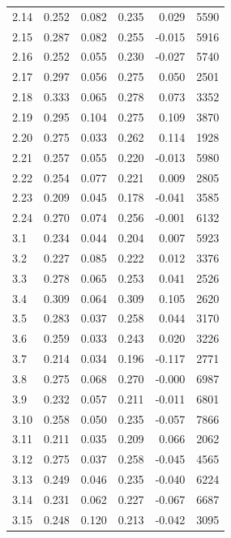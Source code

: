 \begin{longtable}{lrrrrr}
2.14 & 0.252 & 0.082 & 0.235 & 0.029 & 5590 \\
2.15 & 0.287 & 0.082 & 0.255 & -0.015 & 5916 \\
2.16 & 0.252 & 0.055 & 0.230 & -0.027 & 5740 \\
2.17 & 0.297 & 0.056 & 0.275 & 0.050 & 2501 \\
2.18 & 0.333 & 0.065 & 0.278 & 0.073 & 3352 \\
2.19 & 0.295 & 0.104 & 0.275 & 0.109 & 3870 \\
2.20 & 0.275 & 0.033 & 0.262 & 0.114 & 1928 \\
2.21 & 0.257 & 0.055 & 0.220 & -0.013 & 5980 \\
2.22 & 0.254 & 0.077 & 0.221 & 0.009 & 2805 \\
2.23 & 0.209 & 0.045 & 0.178 & -0.041 & 3585 \\
2.24 & 0.270 & 0.074 & 0.256 & -0.001 & 6132 \\
3.1 & 0.234 & 0.044 & 0.204 & 0.007 & 5923 \\
3.2 & 0.227 & 0.085 & 0.222 & 0.012 & 3376 \\
3.3 & 0.278 & 0.065 & 0.253 & 0.041 & 2526 \\
3.4 & 0.309 & 0.064 & 0.309 & 0.105 & 2620 \\
3.5 & 0.283 & 0.037 & 0.258 & 0.044 & 3170 \\
3.6 & 0.259 & 0.033 & 0.243 & 0.020 & 3226 \\
3.7 & 0.214 & 0.034 & 0.196 & -0.117 & 2771 \\
3.8 & 0.275 & 0.068 & 0.270 & -0.000 & 6987 \\
3.9 & 0.232 & 0.057 & 0.211 & -0.011 & 6801 \\
3.10 & 0.258 & 0.050 & 0.235 & -0.057 & 7866 \\
3.11 & 0.211 & 0.035 & 0.209 & 0.066 & 2062 \\
3.12 & 0.275 & 0.037 & 0.258 & -0.045 & 4565 \\
3.13 & 0.249 & 0.046 & 0.235 & -0.040 & 6224 \\
3.14 & 0.231 & 0.062 & 0.227 & -0.067 & 6687 \\
3.15 & 0.248 & 0.120 & 0.213 & -0.042 & 3095 \\
\end{longtable}
